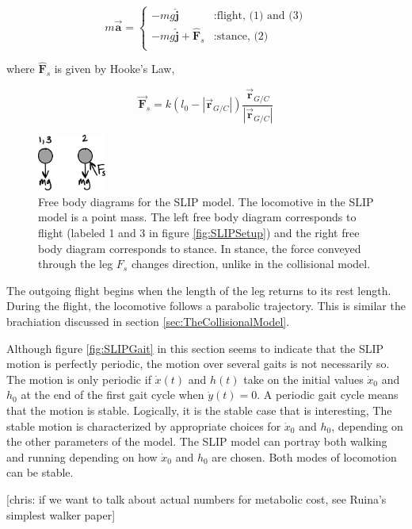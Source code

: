 \begin{displaymath}
   m\vec{\mathbf{a}} = \left\{
     \begin{array}{ll}
        -mg \hat{\mathbf{j}} & : \mbox{flight, (1) and (3)} \\
       -mg \hat{\mathbf{j}} + \hat{\mathbf{F}}_s & : \mbox{stance, (2)} \\
     \end{array}
   \right.
\end{displaymath}

where $\hat{\mathbf{F}}_s$ is given by Hooke's Law,

\begin{equation}
\vec{\mathbf{F}}_s = k (l_0 - |\vec{\mathbf{r}}_{G/C}| ) \frac{\vec{\mathbf{r}}_{G/C}}{|\vec{\mathbf{r}}_{G/C}|}
\end{equation}

\begin{figure}[h]		%
\begin{centering}
\includegraphics[width=0.2\textwidth]{Figures/SLIPFBD}\par
\end{centering}
\caption[Diagram: Free Body Diagrams for the SLIP Model]{Free body diagrams for the SLIP model. The locomotive in the SLIP model is a point mass. The left free body diagram corresponds to flight (labeled 1 and 3 in figure \ref{fig:SLIPSetup}) and the right free body diagram corresponds to stance. In stance, the force conveyed through the leg $F_{s}$ changes direction, unlike in the collisional model.}
\label{fig:SLIPFBD}
\end{figure}
%

The outgoing flight begins when the length of the leg returns to its rest length. During the flight, the locomotive follows a parabolic trajectory. This is similar the brachiation discussed in section \ref{sec:TheCollisionalModel}.

Although figure \ref{fig:SLIPGait} in this section seems to indicate that the SLIP motion is perfectly periodic, the motion over several gaits is not necessarily so. The motion is only periodic if $\dot{x}(t)$ and $h(t)$ take on the initial values $\dot{x}_{0}$ and $h_{0}$ at the end of the first gait cycle when $\dot{y}(t) = 0$. A periodic gait cycle means that the motion is stable. Logically, it is the stable case that is interesting, The stable motion is characterized by appropriate choices for $\dot{x}_0$ and $h_0$, depending on the other parameters of the model. The SLIP model can portray both walking and running depending on how $\dot{x}_0$ and $h_0$ are chosen. Both modes of locomotion can be stable.


[chris: if we want to talk about actual numbers for metabolic cost, see Ruina's simplest walker paper]